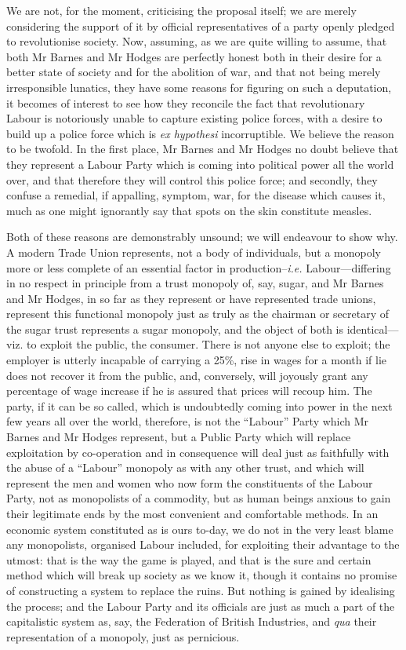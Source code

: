 \documentclass{book}
\begin{document}
We are not, for the moment, criticising the proposal itself; we are merely considering the support of it by official representatives of a party openly pledged to revolutionise society. Now, assuming, as we are quite willing to assume, that both Mr Barnes and Mr Hodges are perfectly honest both in their desire for a better state of society and for the abolition of war, and that not being merely irresponsible lunatics, they have some reasons for figuring on such a deputation, it becomes of interest to see how they reconcile the fact that revolutionary Labour is notoriously unable to capture existing police forces, with a desire to build up a police force which is \emph{ex hypothesi} incorruptible. We believe the reason to be twofold. In the first place, Mr Barnes and Mr Hodges no doubt believe that they represent a Labour Party which is coming into political power all the world over, and that therefore they will control this police force; and secondly, they confuse a remedial, if appalling, symptom, war, for the disease which causes it, much as one might ignorantly say that spots on the skin constitute measles.

Both of these reasons are demonstrably unsound; we will endeavour to show why. A modern Trade Union represents, not a body of individuals, but a monopoly more or less complete of an essential factor in production–\emph{i.e.} Labour—differing in no respect in principle from a trust monopoly of, say, sugar, and Mr Barnes and Mr Hodges, in so far as they represent or have represented trade unions, represent this functional monopoly just as truly as the chairman or secretary of the sugar trust represents a sugar monopoly, and the object of both is identical—viz. to exploit the public, the consumer. There is not anyone else to exploit; the employer is utterly incapable of carrying a 25\%, rise in wages for a month if lie does not recover it from the public, and, conversely, will joyously grant any percentage of wage increase if he is assured that prices will recoup him. The party, if it can be so called, which is undoubtedly coming into power in the next few years all over the world, therefore, is not the “Labour” Party which Mr Barnes and Mr Hodges represent, but a Public Party which will replace exploitation by co-operation and in consequence will deal just as faithfully with the abuse of a “Labour” monopoly as with any other trust, and which will represent the men and women who now form the constituents of the Labour Party, not as monopolists of a commodity, but as human beings anxious to gain their legitimate ends by the most convenient and comfortable methods. In an economic system constituted as is ours to-day, we do not in the very least blame any monopolists, organised Labour included, for exploiting their advantage to the utmost: that is the way the game is played, and that is the sure and certain method which will break up society as we know it, though it contains no promise of constructing a system to replace the ruins. But nothing is gained by idealising the process; and the Labour Party and its officials are just as much a part of the capitalistic system as, say, the Federation of British Industries, and \emph{qua} their representation of a monopoly, just as pernicious.
\end{document}
